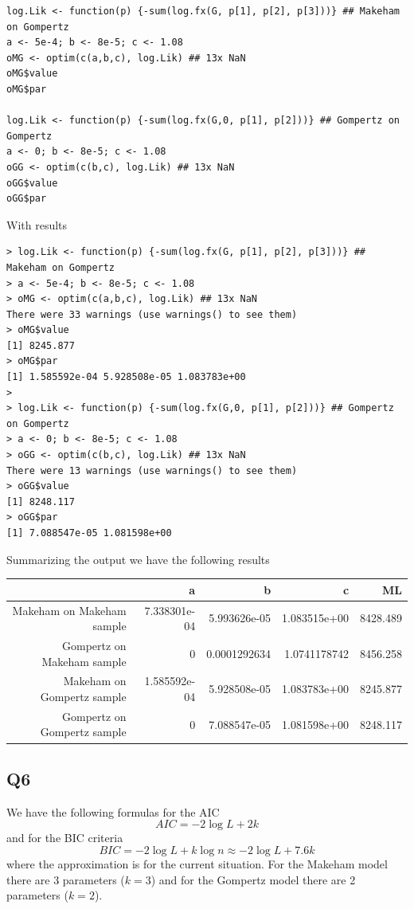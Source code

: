 \begin{verbatim}
log.Lik <- function(p) {-sum(log.fx(G, p[1], p[2], p[3]))} ## Makeham on Gompertz
a <- 5e-4; b <- 8e-5; c <- 1.08
oMG <- optim(c(a,b,c), log.Lik) ## 13x NaN
oMG$value
oMG$par

log.Lik <- function(p) {-sum(log.fx(G,0, p[1], p[2]))} ## Gompertz on Gompertz
a <- 0; b <- 8e-5; c <- 1.08
oGG <- optim(c(b,c), log.Lik) ## 13x NaN
oGG$value
oGG$par
\end{verbatim}

With results 

\begin{verbatim}
> log.Lik <- function(p) {-sum(log.fx(G, p[1], p[2], p[3]))} ## Makeham on Gompertz
> a <- 5e-4; b <- 8e-5; c <- 1.08
> oMG <- optim(c(a,b,c), log.Lik) ## 13x NaN
There were 33 warnings (use warnings() to see them)
> oMG$value
[1] 8245.877
> oMG$par
[1] 1.585592e-04 5.928508e-05 1.083783e+00
> 
> log.Lik <- function(p) {-sum(log.fx(G,0, p[1], p[2]))} ## Gompertz on Gompertz
> a <- 0; b <- 8e-5; c <- 1.08
> oGG <- optim(c(b,c), log.Lik) ## 13x NaN
There were 13 warnings (use warnings() to see them)
> oGG$value
[1] 8248.117
> oGG$par
[1] 7.088547e-05 1.081598e+00
\end{verbatim}

Summarizing the output we have the following results 

\begin{center}

\begin{tabular}{r | r | r | r | r}
 							 & a & b & c & ML \\ \hline
 Makeham on Makeham sample 	 & 7.338301e-04 & 5.993626e-05 & 1.083515e+00 & 8428.489 \\
 Gompertz on Makeham sample  & 0 & 0.0001292634 & 1.0741178742 & 8456.258 \\
 Makeham on Gompertz sample  & 1.585592e-04 & 5.928508e-05 & 1.083783e+00 & 8245.877 \\
 Gompertz on Gompertz sample & 0 & 7.088547e-05 & 1.081598e+00 & 8248.117 
 
\end{tabular}

\end{center}

\subsection*{Q6}

We have the following formulas for the AIC
\begin{equation}
AIC = -2 \log L + 2k
\end{equation}
and for the BIC criteria 
\begin{equation}
BIC = -2 \log L + k \log n \approx -2 \log L + 7.6k
\end{equation}
where the approximation is for the current situation. For the Makeham model there are 3 parameters ($k = 3$) and for the Gompertz model there are 2 parameters ($k=2$).

